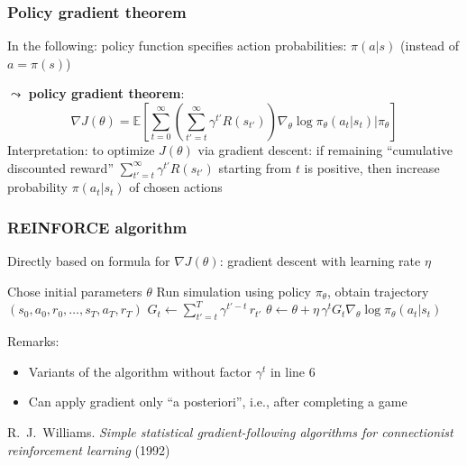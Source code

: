 \documentclass[t]{beamer}
\begin{document}
\begin{frame}
\frametitle{Policy gradient theorem}
In the following: policy function specifies action probabilities: $\pi(a \vert s)$ (instead of $a = \pi(s)$)

$\leadsto$ \textbf{policy gradient theorem}:
\[
\nabla J(\theta) = \mathbb{E}\!\left[ \sum_{t=0}^{\infty} \left(\sum_{t'=t}^{\infty} \gamma^{t'} R(s_{t'})\right) \nabla_{\theta} \log \pi_{\theta}(a_t \vert s_t) \big\vert \pi_{\theta} \right]
\]
Interpretation: to optimize $J(\theta)$ via gradient descent: if remaining ``cumulative discounted reward'' $\sum_{t'=t}^{\infty} \gamma^{t'} R(s_{t'})$ starting from $t$ is positive, then increase probability $\pi(a_t \vert s_t)$ of chosen actions
\end{frame}



\begin{frame}
\frametitle{REINFORCE algorithm}
Directly based on formula for $\nabla J(\theta)$: gradient descent with learning rate $\eta$

\begin{algorithmic}[1]
\State Chose initial parameters $\theta$
    \State Run simulation using policy $\pi_{\theta}$, obtain trajectory $(s_0, a_0, r_0, \dots, s_T, a_T, r_T)$
        \State $G_t \gets \sum_{t'=t}^T \gamma^{t'-t} \, r_{t'}$
        \State $\theta \gets \theta + \eta \, \gamma^t G_t \nabla_{\theta} \log \pi_{\theta}(a_t \vert s_t)$ 
    \EndFor
\EndFor
\end{algorithmic}

Remarks:\\
\begin{itemize}
\item Variants of the algorithm without factor $\gamma^t$ in line $6$
\item Can apply gradient only ``a posteriori'', i.e., after completing a game
\end{itemize}

\vfill

{\small
R.~J.~Williams. \emph{Simple statistical gradient-following algorithms for connectionist reinforcement learning} (1992) \nocite{Williams1992}
}
\end{frame}
\end{document}
